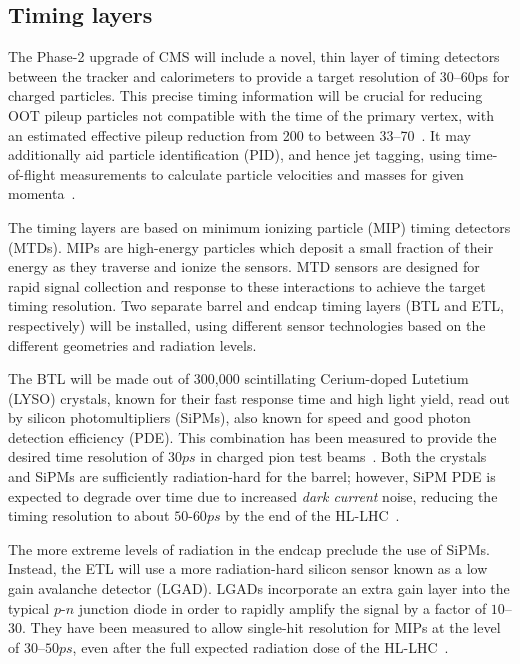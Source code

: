 \subsection{Timing layers}

The Phase-2 upgrade of CMS will include a novel, thin layer of timing detectors between the tracker and calorimeters to provide a target resolution of 30--60\unit{ps} for charged particles.
This precise timing information will be crucial for reducing OOT pileup particles not compatible with the time of the primary vertex, with an estimated effective pileup reduction from 200 to between 33--70~\cite{Pandolfi:2019ehi}.
It may additionally aid particle identification (PID), and hence jet tagging, using time-of-flight measurements to calculate particle velocities and masses for given momenta~\cite{Soffi:2840966}.

The timing layers are based on minimum ionizing particle (MIP) timing detectors (MTDs).
MIPs are high-energy particles which deposit a small fraction of their energy as they traverse and ionize the sensors.
MTD sensors are designed for rapid signal collection and response to these interactions to achieve the target timing resolution.
Two separate barrel and endcap timing layers (BTL and ETL, respectively) will be installed, using different sensor technologies based on the different geometries and radiation levels.

The BTL will be made out of 300,000 scintillating Cerium-doped Lutetium (LYSO) crystals, known for their fast response time and high light yield, read out by silicon photomultipliers (SiPMs), also known for speed and good photon detection efficiency (PDE).
This combination has been measured to provide the desired time resolution of $30\unit{ps}$ in charged pion test beams~\cite{Butler:2019rpu}.
Both the crystals and SiPMs are sufficiently radiation-hard for the barrel; however, SiPM PDE is expected to degrade over time due to increased \textit{dark current} noise, reducing the timing resolution to about $50$-$60\unit{ps}$ by the end of the HL-LHC~\cite{Butler:2019rpu}.

The more extreme levels of radiation in the endcap preclude the use of SiPMs.
Instead, the ETL will use a more radiation-hard silicon sensor known as a low gain avalanche detector (LGAD).
LGADs incorporate an extra gain layer into the typical $p$-$n$ junction diode in order to rapidly amplify the signal by a factor of $10$--$30$.
They have been measured to allow single-hit resolution for MIPs at the level of $30$--$50\unit{ps}$, even after the full expected radiation dose of the HL-LHC~\cite{Pandolfi:2019ehi}.

